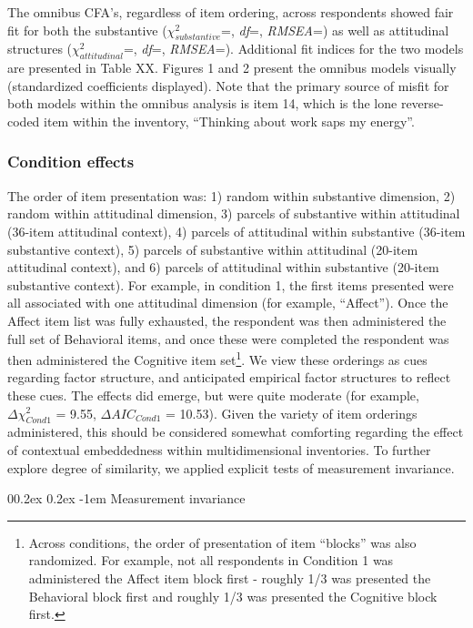 \documentclass[
  man]{apa7}
\makeatletter
\let\oldparagraph\paragraph
\renewcommand{\paragraph}[1]{\oldparagraph{#1}\mbox{}}
\renewcommand{\paragraph}{\@startsection{paragraph}{4}{\parindent}%
  {0\baselineskip \@plus 0.2ex \@minus 0.2ex}%
  {-1em}%
  {\normalfont\normalsize\bfseries\itshape\typesectitle}}
\makeatother
\begin{document}
The omnibus CFA's, regardless of item ordering, across respondents showed fair fit for both the substantive (\(\chi^2_{substantive}\)=, \emph{df}=, \emph{RMSEA}=) as well as attitudinal structures (\(\chi^2_{attitudinal}\)=, \emph{df}=, \emph{RMSEA}=). Additional fit indices for the two models are presented in Table XX. Figures 1 and 2 present the omnibus models visually (standardized coefficients displayed). Note that the primary source of misfit for both models within the omnibus analysis is item 14, which is the lone reverse-coded item within the inventory, ``Thinking about work saps my energy''.

\hypertarget{condition-effects}{%
\subsubsection{Condition effects}\label{condition-effects}}

The order of item presentation was: 1) random within substantive dimension, 2) random within attitudinal dimension, 3) parcels of substantive within attitudinal (36-item attitudinal context), 4) parcels of attitudinal within substantive (36-item substantive context), 5) parcels of substantive within attitudinal (20-item attitudinal context), and 6) parcels of attitudinal within substantive (20-item substantive context). For example, in condition 1, the first items presented were all associated with one attitudinal dimension (for example, ``Affect''). Once the Affect item list was fully exhausted, the respondent was then administered the full set of Behavioral items, and once these were completed the respondent was then administered the Cognitive item set\footnote{Across conditions, the order of presentation of item ``blocks'' was also randomized. For example, not all respondents in Condition 1 was administered the Affect item block first - roughly 1/3 was presented the Behavioral block first and roughly 1/3 was presented the Cognitive block first.}. We view these orderings as cues regarding factor structure, and anticipated empirical factor structures to reflect these cues. The effects did emerge, but were quite moderate (for example, \(\Delta{\chi^2_{Cond1}}\) = 9.55, \(\Delta{AIC_{Cond1}}\) = 10.53). Given the variety of item orderings administered, this should be considered somewhat comforting regarding the effect of contextual embeddedness within multidimensional inventories. To further explore degree of similarity, we applied explicit tests of measurement invariance.

\hypertarget{measurement-invariance}{%
\paragraph{Measurement invariance}\label{measurement-invariance}}
\end{document}
